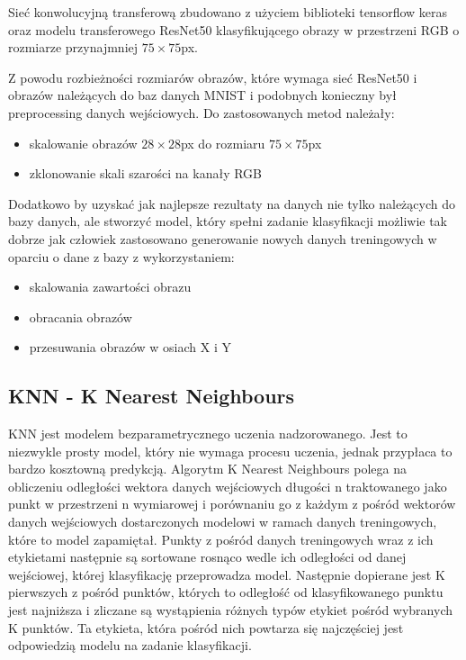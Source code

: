 \documentclass{article}
\begin{document}
Sieć konwolucyjną transferową zbudowano z użyciem biblioteki tensorflow keras oraz modelu transferowego ResNet50 klasyfikującego obrazy w przestrzeni RGB o rozmiarze przynajmniej $75\times75$px.

Z powodu rozbieżności rozmiarów obrazów, które wymaga sieć ResNet50 i obrazów należących do baz danych MNIST i podobnych konieczny był preprocessing danych wejściowych. Do zastosowanych metod należały:

\begin{itemize}
\item skalowanie obrazów $28\times28$px do rozmiaru $75\times75$px
\item zklonowanie skali szarości na kanały RGB 
\end{itemize}

Dodatkowo by uzyskać jak najlepsze rezultaty na danych nie tylko należących do bazy danych, ale stworzyć model, który spełni zadanie klasyfikacji możliwie tak dobrze jak człowiek zastosowano generowanie nowych danych treningowych w oparciu o dane z bazy z wykorzystaniem:

\begin{itemize}
\item skalowania zawartości obrazu
\item obracania obrazów
\item przesuwania obrazów w osiach X i Y
\end{itemize}



\subsection{KNN - K Nearest Neighbours}
KNN jest modelem bezparametrycznego uczenia nadzorowanego. Jest to niezwykle prosty model, który nie wymaga procesu uczenia, jednak przypłaca to bardzo kosztowną predykcją.
Algorytm K Nearest Neighbours polega na obliczeniu odległości wektora danych wejściowych długości n traktowanego jako punkt w przestrzeni n wymiarowej i porównaniu go z każdym z pośród wektorów danych wejściowych dostarczonych modelowi w ramach danych treningowych, które to model zapamiętał. Punkty z pośród danych treningowych wraz z ich etykietami następnie są sortowane rosnąco wedle ich odległości od danej wejściowej, której klasyfikację przeprowadza model. Następnie dopierane jest K pierwszych z pośród punktów, których to odległość od klasyfikowanego punktu jest najniższa i zliczane są wystąpienia różnych typów etykiet pośród wybranych K punktów. Ta etykieta, która pośród nich powtarza się najczęściej jest odpowiedzią modelu na zadanie klasyfikacji.
\end{document}
